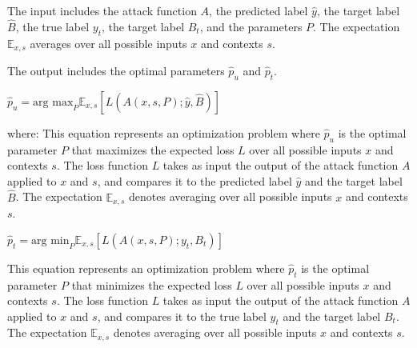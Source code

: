The input includes the attack function $A$, the predicted label $\hat{y}$, the target label $\hat{B}$, the true label $y_t$, the target label $B_t$, and the parameters $P$. The expectation $\mathbb{E}_{x,s}$ averages over all possible inputs $x$ and contexts $s$.

The output includes the optimal parameters $\hat{p}_u$ and $\hat{p}_t$.

$\hat{p}_u = \text{arg max}_P \mathbb{E}_{x,s}[L(A(x, s, P); \hat{y}, \hat{B})]$

where:
This equation represents an optimization problem where $\hat{p}_u$ is the optimal parameter $P$ that maximizes the expected loss $L$ over all possible inputs $x$ and contexts $s$. The loss function $L$ takes as input the output of the attack function $A$ applied to $x$ and $s$, and compares it to the predicted label $\hat{y}$ and the target label $\hat{B}$. The expectation $\mathbb{E}_{x,s}$ denotes averaging over all possible inputs $x$ and contexts $s$.

$\hat{p}_t = \text{arg min}_P \mathbb{E}_{x,s}[L(A(x, s, P); y_t, B_t)]$

This equation represents an optimization problem where $\hat{p}_t$ is the optimal parameter $P$ that minimizes the expected loss $L$ over all possible inputs $x$ and contexts $s$. The loss function $L$ takes as input the output of the attack function $A$ applied to $x$ and $s$, and compares it to the true label $y_t$ and the target label $B_t$. The expectation $\mathbb{E}_{x,s}$ denotes averaging over all possible inputs $x$ and contexts $s$.

